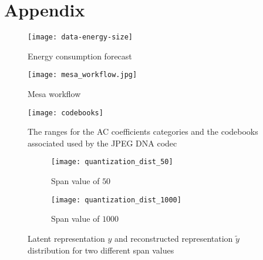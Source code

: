 
\chapter*{Appendix}

\begin{figure}
    \centering
    \texttt{[image: data-energy-size]}
    \caption{Energy consumption forecast}
    \label{fig:consumption}
\end{figure}

\begin{figure}
    \centering
    \texttt{[image: mesa\_workflow.jpg]}
    \caption{Mesa workflow}
    \label{fig:mesa_workflow}
\end{figure}

% 

\begin{figure}
    \centering
    \texttt{[image: codebooks]}
    \caption{The ranges for the AC coefficients categories and the codebooks associated used by the JPEG DNA codec}
    \label{fig:codebooks}
\end{figure}

\begin{figure}
    \begin{subfigure}{0.5\textwidth}
        \centering
        \texttt{[image: quantization\_dist\_50]}
        \caption{Span value of $50$}
        \label{fig:quantized-y-50}
    \end{subfigure}
    \begin{subfigure}{0.5\textwidth}
        \centering
        \texttt{[image: quantization\_dist\_1000]}
        \caption{Span value of $1000$}
        \label{fig:quantized-y-1000}
    \end{subfigure}
    \caption{Latent representation $y$ and reconstructed representation $\tilde{y}$ distribution for two different span values}
    \label{fig:quantized-y}
\end{figure}


